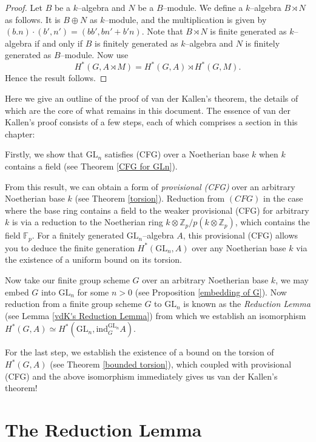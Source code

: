 \documentclass{article}
\theoremstyle{plain}
\theoremstyle{definition}
\newcommand{\GL}{\mathrm{GL}}
\begin{document}
\begin{proof}
    Let $B$ be  a $k$--algebra and $N$ be a $B$--module. We define a $k$--algebra $B\rtimes N$ as follows. It is  $B\oplus N$ as $k$--module, and the multiplication is given by  $(b.n)\cdot (b',n')=(bb',bn'+b'n)$. Note that $B\rtimes N$ is finite generated as $k$--algebra if and only if $B$ is finitely generated as $k$--algebra and $N$ is finitely generated as $B$--module. Now use 
    \[
    H^\ast(G,A\rtimes M)=H^\ast(G,A)\rtimes H^\ast(G,M).
    \]
    Hence the result follows.  \qedhere \end{proof}

Here we give an outline of the proof of van der Kallen's theorem, the details of which are the core of what remains in this document. The essence of van der Kallen's proof consists of a few steps, each of which comprises a section in this chapter:

Firstly, we show that $\GL_n$ satisfies (CFG) over a Noetherian base $k$ when $k$ contains a field (see Theorem \ref{CFG for GLn}).

From this result, we can obtain a form of \textit{provisional (CFG)} over an arbitrary Noetherian base $k$ (see Theorem \ref{torsion}). Reduction from $(CFG)$ in the case where the base ring contains a field to the weaker provisional (CFG) for arbitrary $k$ is via a reduction to the Noetherian ring $k \otimes \mathbb{Z}_p/p(k \otimes \mathbb{Z}_p)$, which contains the field $\mathbb{F}_p$. For a finitely generated $\GL_n$--algebra $A$, this provisional (CFG) allows you to deduce the finite generation $H^*(\GL_n, A)$ over any Noetherian base $k$ via the existence of a uniform bound on its torsion. 

Now take our finite group scheme $G$ over an arbitrary Noetherian base $k$, we may embed $G$ into $\GL_n$ for some $n>0$ (see Proposition \ref{embedding of G}). Now reduction from a finite group scheme $G$ to $\GL_n$ is known as the \textit{Reduction Lemma} (see Lemma \ref{vdK's Reduction Lemma}) from which we establish an isomorphism $H^*(G, A)\simeq H^*(\GL_n,\mathrm{ind}_G^{\GL_n} A )$.

For the last step, we establish the existence of a bound on the torsion of $H^*(G, A)$ (see Theorem \ref{bounded torsion}), which coupled with provisional (CFG) and the above isomorphism immediately gives us van der Kallen's theorem!

\pagebreak

\section{The Reduction Lemma}\label{section: reduction lemma}
\end{document}
